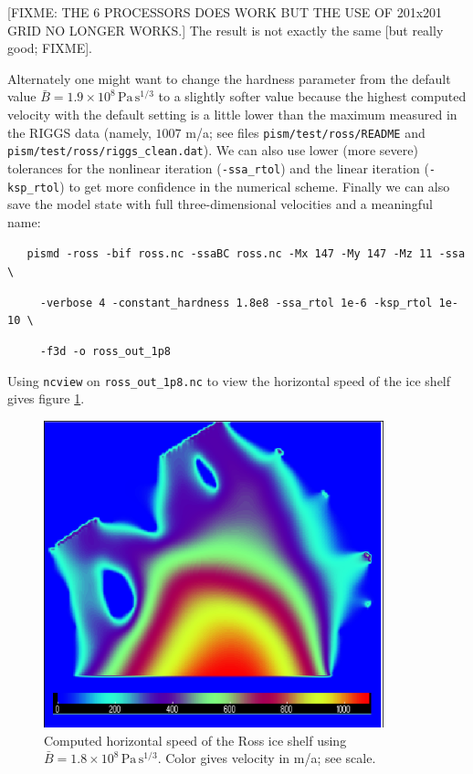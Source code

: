 \documentclass[11pt,final]{amsart}
\begin{document}
[FIXME: THE 6 PROCESSORS DOES WORK BUT THE USE OF 201x201 GRID NO LONGER WORKS.]  The result is not exactly the same [but really good; FIXME].

Alternately one might want to change the hardness parameter from the default value $\bar B = 1.9 \times 10^8 \, \text{Pa}\, \text{s}^{1/3}$ \cite{MacAyealetal} to a slightly softer value because the highest computed velocity with the default setting is a little lower than the maximum measured in the RIGGS data (namely, $1007$ m/a; see files \verb|pism/test/ross/README| and \verb|pism/test/ross/riggs_clean.dat|).   We can also use lower (more severe) tolerances for the nonlinear iteration (\verb|-ssa_rtol|) and the linear iteration (\verb|-ksp_rtol|) to get more confidence in the numerical scheme.   Finally we can also save the model state with full three-dimensional velocities and a meaningful name:

\verb|   pismd -ross -bif ross.nc -ssaBC ross.nc -Mx 147 -My 147 -Mz 11 -ssa \|

\verb|     -verbose 4 -constant_hardness 1.8e8 -ssa_rtol 1e-6 -ksp_rtol 1e-10 \|

\verb|     -f3d -o ross_out_1p8|

\noindent Using \verb|ncview| on \verb|ross_out_1p8.nc| to view the horizontal speed of the ice shelf gives figure \ref{fig:rossspeed1p8}.

\begin{figure}[ht]
\includegraphics[height=3.5in,keepaspectratio=true]{figs/rossspeed1p8}
\caption{Computed horizontal speed of the Ross ice shelf using $\bar B = 1.8 \times 10^8 \, \text{Pa}\, \text{s}^{1/3}$.  Color gives velocity in m/a; see scale.}
\label{fig:rossspeed1p8}
\end{figure}
\end{document}
